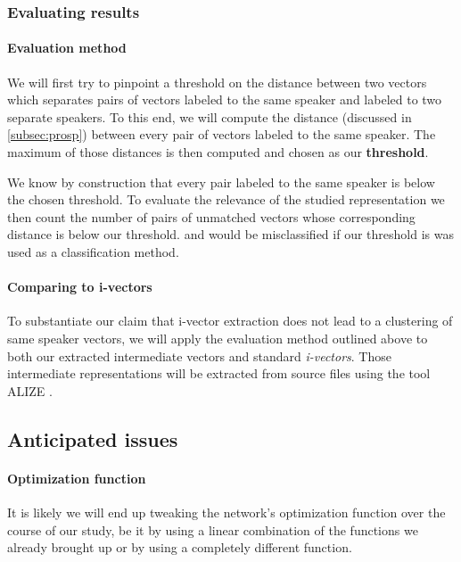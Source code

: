\documentclass[conference]{IEEEtran}
\begin{document}
\subsubsection{Evaluating results}

\paragraph{Evaluation method}

We will first try to pinpoint a threshold on the distance
between two vectors which separates pairs of vectors labeled to the same speaker
and labeled to two separate speakers. To this end, we will compute the distance
(discussed in \ref{subsec:prosp}) between every pair of vectors labeled to the
same speaker. The maximum of those distances is then computed and chosen as our
\textbf{threshold}.

We know by construction that every pair labeled to the same speaker is below the
chosen threshold. To evaluate the relevance of the studied representation we
then count the number of pairs of unmatched vectors whose corresponding distance
is below our threshold. and would be misclassified if our threshold is was used
as a classification method.

\paragraph{Comparing to i-vectors}

 To substantiate our claim that i-vector extraction does not lead to a
 clustering of same speaker vectors, we will apply the evaluation method
 outlined above to both our
 extracted intermediate vectors and standard \emph{i-vectors}. Those
 intermediate representations will be extracted from source files using the tool
 ALIZE \cite{larcher2013alize}.

\subsection{Anticipated issues}

\paragraph{Optimization function}

It is likely we will end up tweaking the network's optimization function over the course
of our study, be it by using a linear combination of the functions we already
brought up or by using a completely different function.
\end{document}
